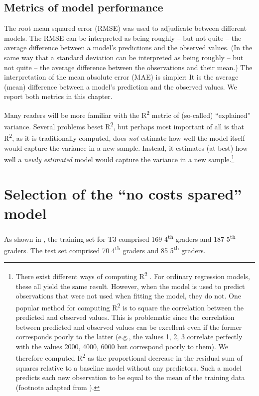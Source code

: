 \documentclass[output=paper]{langsci/langscibook}
\begin{document}
\subsection{Metrics of model performance}

The root mean squared error (RMSE) was used to adjudicate between different models. The RMSE can be interpreted as being roughly – but not quite – the average difference between a model’s predictions and the observed values. (In the same way that a standard deviation can be interpreted as being roughly – but not quite – the average difference between the observations and their mean.) The interpretation of the mean absolute error (MAE) is simpler: It is the average (mean) difference between a model’s prediction and the observed values. We report both metrics in this chapter.

Many readers will be more familiar with the R\textsuperscript{2} metric of (so-called) ``explained'' variance. Several problems beset R\textsuperscript{2}, but perhaps most important of all is that R\textsuperscript{2}, as it is traditionally computed, does \textit{not} estimate how well the model itself would capture the variance in a new sample. Instead, it estimates (at best) how well a \textit{newly estimated} model would capture the variance in a new sample.\footnote{There exist different ways of computing R\textsuperscript{2} \citep{Kvålseth1985}. For ordinary regression models, these all yield the same result. However, when the model is used to predict observations that were not used when fitting the model, they do not. One popular method for computing R\textsuperscript{2} is to square the correlation between the predicted and observed values. This is problematic since the correlation between predicted and observed values can be excellent even if the former corresponds poorly to the latter (e.g., the values 1, 2, 3 correlate perfectly with the values 2000, 4000, 6000 but correspond poorly to them). We therefore computed R\textsuperscript{2} as the proportional decrease in the residual sum of squares relative to a baseline model without any predictors. Such a model predicts each new observation to be equal to the mean of the training data (footnote adapted from \citealt{VanhoveEtAl2019}).}

\section{Selection of the ``no costs spared'' model}

As shown in , the training set for T3 comprised 169 4\textsuperscript{th} graders and 187 5\textsuperscript{th} graders. The test set comprised 70 4\textsuperscript{th} graders and 85 5\textsuperscript{th} graders.
\end{document}
